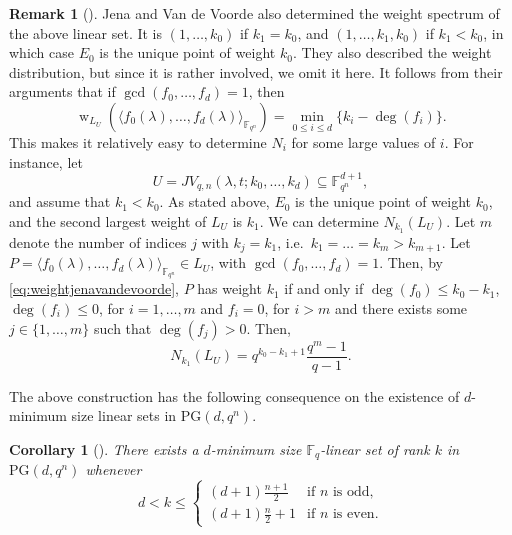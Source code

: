 \documentclass[11pt]{article}
\newtheorem{corollary}[theorem]{Corollary}
\theoremstyle{definition}
\newtheorem{remark}[theorem]{Remark}
\newcommand{\fqn}{\mathbb{F}_{q^n}}
\newcommand{\F}{{\mathbb F}}
\newcommand{\PG}{\mathrm{PG}}
\newcommand{\pg}{\PG}
\DeclareMathOperator{\ww}{w}
\begin{document}
\begin{remark}[{\cite[Remark 2.19]{Jena2021onlinearsets}}]
 \label{rk:WeightSpectrumJena}
Jena and Van de Voorde also determined the weight spectrum of the above linear set.
It is $(1,\dots,k_0)$ if $k_1 = k_0$, and $(1,\dots,k_1,k_0)$ if $k_1 < k_0$, in which case $E_0$ is the unique point of weight $k_0$.
They also described the weight distribution, but since it is rather involved, we omit it here.
It follows from their arguments that if $\gcd(f_0, \dots, f_d) = 1$, then
\begin{equation} \label{eq:weightjenavandevoorde}
 \ww_{L_U}\left( \langle f_0(\lambda), \dots, f_d(\lambda) \rangle_{\fqn} \right)
 = \min_{0 \leq i \leq d} \{k_i - \deg(f_i)\}.
\end{equation}
This makes it relatively easy to determine $N_i$ for some large values of $i$.
For instance, let \[
 U = JV_{q,n}(\lambda,t;k_0,\dots,k_d) \subseteq \F_{q^n}^{d+1},
\]
and assume that $k_1 < k_0$. As stated above, $E_0$ is the unique point of weight $k_0$, and the second largest weight of $L_{U}$ is $k_1$.
We can determine $N_{k_1}(L_U)$. 
Let $m$ denote the number of indices $j$ with $k_j = k_1$, i.e.\ $k_1= \ldots = k_{m} > k_{m+1}$. Let $P=\langle f_0(\lambda), \dots, f_d(\lambda) \rangle_{\fqn} \in L_U$, with $\gcd(f_0, \dots, f_d) = 1$. Then, by \eqref{eq:weightjenavandevoorde}, $P$ has weight $k_1$ if and only if $\deg(f_0) \leq k_0-k_1$, $\deg(f_i) \leq 0$, for $i=1,\ldots,m$ and $f_i = 0$, for $i>m$ and there exists some $j \in \{1,\ldots,m\}$ such that $\deg(f_j) > 0$.
Then, 
\[
 N_{k_1}(L_{U}) = q^{k_0 - k_1 + 1}\frac{q^{m}-1}{q-1}.
\]
\end{remark}

The above construction has the following consequence on the existence of $d$-minimum size linear sets in $\pg(d,q^n)$. 

\begin{corollary} [{\cite[Corollary 2.18]{Jena2021onlinearsets}}] 
 \label{cor:maximumsizeminimum}
There exists a $d$-minimum size $\F_q$-linear set of rank $k$ in $\PG(d,q^n)$ whenever
\[
 d < k \leq \begin{cases}
  (d+1)\frac{n+1}{2} & \text{if $n$ is odd,} \\
  (d+1)\frac{n}{2} + 1 & \text{if $n$ is even.}
 \end{cases} 
\]
\end{corollary}


\end{document}
